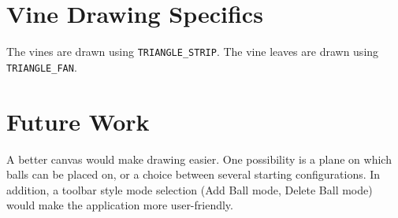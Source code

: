 \documentclass[letterpaper,10pt]{IEEEtran}
\begin{document}
\section{Vine Drawing Specifics}

The vines are drawn using  \verb+TRIANGLE_STRIP+. 
The vine leaves are drawn using \verb+TRIANGLE_FAN+. 

\section{Future Work}


A better canvas would make drawing easier.
One possibility is a plane on which balls can be placed on, or a choice between several starting configurations.
In addition, a toolbar style mode selection (Add Ball mode, Delete Ball mode) would make the application more user-friendly.

%
\end{document}
